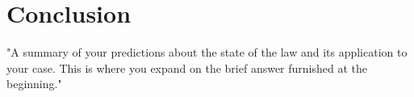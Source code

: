 \documentclass[11pt]{article}
\newcommand{\tocheck}[1]{{\bf !?: #1 :!?}}
\begin{document}
\begin{itemize}




\end{itemize}






			







\section{Conclusion}
"A summary of your predictions about the state of the law and its application to your case.
This is where you expand on the brief answer furnished at the beginning."
\end{document}
